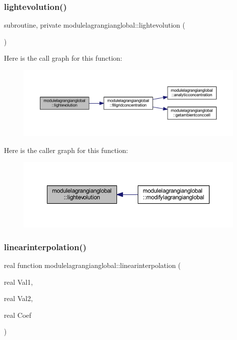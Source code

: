 \subsubsection{\texorpdfstring{lightevolution()}{lightevolution()}}
{\footnotesize\ttfamily subroutine, private modulelagrangianglobal\+::lightevolution (\begin{DoxyParamCaption}{ }\end{DoxyParamCaption})\hspace{0.3cm}{\ttfamily [private]}}

Here is the call graph for this function\+:\nopagebreak
\begin{figure}[H]
\begin{center}
\leavevmode
\includegraphics[width=350pt]{namespacemodulelagrangianglobal_a4cefc1989887113dc6c716f228c4772f_cgraph}
\end{center}
\end{figure}
Here is the caller graph for this function\+:\nopagebreak
\begin{figure}[H]
\begin{center}
\leavevmode
\includegraphics[width=350pt]{namespacemodulelagrangianglobal_a4cefc1989887113dc6c716f228c4772f_icgraph}
\end{center}
\end{figure}
\mbox{\label{namespacemodulelagrangianglobal_a0ac32542f936be812fbc775e622588ce}} 
\subsubsection{\texorpdfstring{linearinterpolation()}{linearinterpolation()}}
{\footnotesize\ttfamily real function modulelagrangianglobal\+::linearinterpolation (\begin{DoxyParamCaption}\item[{real}]{Val1,  }\item[{real}]{Val2,  }\item[{real}]{Coef }\end{DoxyParamCaption})\hspace{0.3cm}{\ttfamily [private]}}

